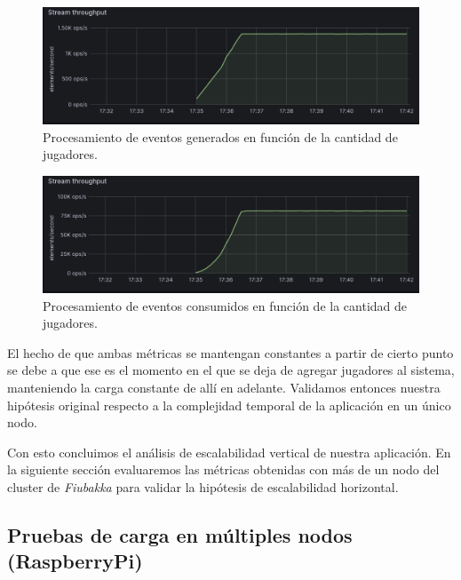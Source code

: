 \begin{figure}[htbp]
    \centering
    \includegraphics[width=1\textwidth]{../assets/stream-producer-amplified-metrics.png}
    \caption{Procesamiento de eventos generados en función de la cantidad de jugadores.}
\end{figure}

\newpage

\begin{figure}[htbp]
    \centering
    \includegraphics[width=1\textwidth]{../assets/stream-consumer-amplified-metrics.png}
    \caption{Procesamiento de eventos consumidos en función de la cantidad de jugadores.}
\end{figure}

El hecho de que ambas métricas se mantengan constantes a partir de cierto punto se debe a que ese es el momento en el que se deja de agregar jugadores al sistema, manteniendo la carga
constante de allí en adelante. Validamos entonces nuestra hipótesis original respecto a la complejidad temporal de la aplicación en un único nodo.

Con esto concluimos el análisis de escalabilidad vertical de nuestra aplicación. En la siguiente sección evaluaremos las métricas obtenidas
con más de un nodo del cluster de \textit{Fiubakka} para validar la hipótesis de escalabilidad horizontal.

\subsection{Pruebas de carga en múltiples nodos (RaspberryPi)}

